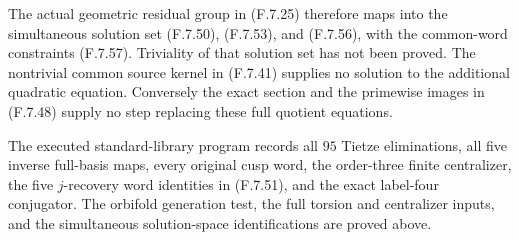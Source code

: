 The actual geometric residual group in (F.7.25)
therefore maps into the simultaneous solution
set (F.7.50), (F.7.53), and (F.7.56), with the
common-word constraints (F.7.57).
Triviality of that solution set has not been
proved.  The nontrivial common source kernel
in (F.7.41) supplies no solution to the additional
quadratic equation.  Conversely the exact
section and the primewise images in (F.7.48)
supply no step replacing these full quotient
equations.

The executed standard-library program
records all $95$ Tietze eliminations, all five
inverse full-basis maps, every original cusp
word, the order-three finite centralizer,
the five $j$-recovery word identities in
(F.7.51), and the exact label-four conjugator.
The orbifold generation test, the full torsion
and centralizer inputs, and the simultaneous
solution-space identifications are proved above.

